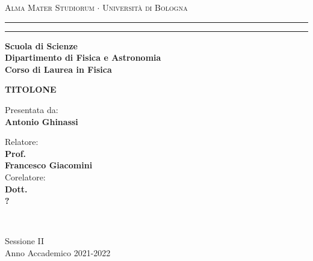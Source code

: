 \documentclass[../main.tex]{subfiles}
\begin{document}
\begin{titlepage}
    \begin{center}
        {{\Large{\textsc{Alma Mater Studiorum $\cdot$ Università di
                            Bologna}}}} \rule[0.1cm]{15.8cm}{0.1mm}
        \rule[0.5cm]{15.8cm}{0.6mm}
        {\small{\bf         Scuola di Scienze \\
                Dipartimento di Fisica e Astronomia\\
                Corso di Laurea in Fisica }}
    \end{center}
    \vspace{15mm}
    \begin{center}
        \vspace{3cm}
        \Large
        {\textbf{TITOLONE}}
        \vspace{1cm}
    \end{center}
    \vspace{40mm}
    \par
    \noindent

    \vspace{1 cm}
    \begin{minipage}[t]{0.34\textwidth}
        \begin{flushleft}
            {Presentata da: \\ \textbf{Antonio Ghinassi}}
        \end{flushleft}
    \end{minipage}
    \begin{minipage}[t]{0.64\textwidth}
        \begin{flushright}
            Relatore: \\
            \textbf{Prof.} \\
            \textbf{Francesco Giacomini} \\
            \vspace{0.5 cm}
            Corelatore: \\
            \textbf{Dott.}
            \\ \textbf{?}
        \end{flushright}
    \end{minipage}\\

    \vspace{20mm}
    \begin{center}
        {\large{ Sessione II\\
                Anno Accademico 2021-2022}}
    \end{center}
\end{titlepage}
\end{document}
